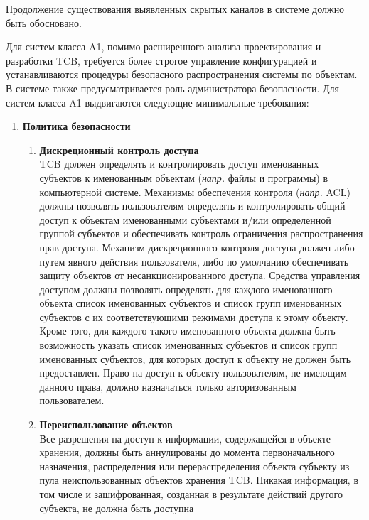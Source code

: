 \begin{enumerate}
\begin{enumerate}
\begin{itemize}
			Продолжение существования выявленных скрытых каналов в системе должно быть обосновано.
		\end{itemize}
		Для систем класса A1, помимо расширенного анализа проектирования и разработки TCB, требуется более строгое управление конфигурацией и устанавливаются
		процедуры безопасного распространения системы по объектам. В системе также предусматривается роль администратора безопасности. Для систем класса A1 выдвигаются следующие минимальные требования:
		\begin{enumerate}
            \item{\textbf{Политика безопасности}}
            \begin{enumerate}
                \item{\textbf{Дискреционный контроль доступа}}\\
                TCB должен определять и контролировать доступ именованных субъектов к именованным объектам (\textit{напр.} файлы и программы) в компьютерной системе. Механизмы обеспечения контроля
                (\textit{напр.} ACL) должны позволять пользователям определять и контролировать общий доступ к объектам именованными субъектами и/или определенной группой субъектов и обеспечивать
                контроль ограничения распространения прав доступа. Механизм дискреционного контроля доступа должен либо путем явного действия пользователя, либо по умолчанию обеспечивать защиту
                объектов от несанкционированного доступа. Средства управления доступом должны позволять определять для каждого именованного объекта список именованных субъектов и список групп
                именованных субъектов с их соответствующими режимами доступа к этому объекту. Кроме того, для каждого такого именованного объекта должна быть возможность указать список
                именованных субъектов и список групп именованных субъектов, для которых доступ к объекту не должен быть предоставлен. Право на доступ к объекту пользователям, не имеющим
                данного права, должно назначаться только авторизованным пользователем.
                \item{\textbf{Переиспользование объектов}}\\
                Все разрешения на доступ к информации, содержащейся в объекте хранения, должны быть аннулированы до момента первоначального назначения, распределения или перераспределения объекта
                субъекту из пула неиспользованных объектов хранения TCB. Никакая информация, в том числе и зашифрованная, созданная в результате действий другого субъекта, не должна быть доступна

\end{enumerate}
\end{enumerate}
\end{enumerate}
\end{enumerate}
